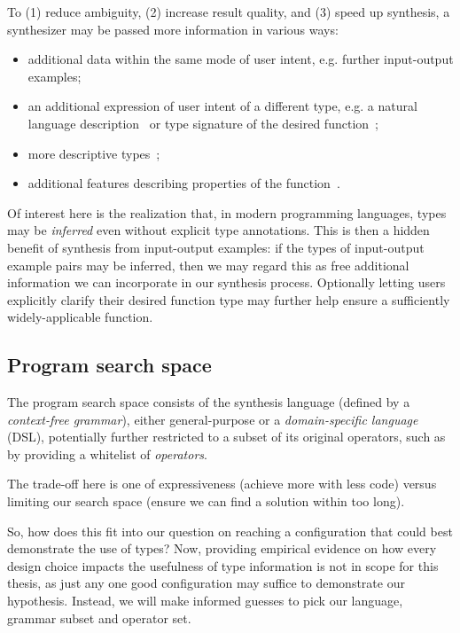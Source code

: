 \documentclass{article}
\begin{document}
To (1) reduce ambiguity, (2) increase result quality, and (3) speed up synthesis, a synthesizer may be passed more information in various ways:
\begin{itemize}
    \item additional data within the same mode of user intent, e.g. further input-output examples;
    \item an additional expression of user intent of a different type, e.g. a natural language description~\citep{polosukhin2018neural} or type signature of the desired function~\citep{myth};
    \item more descriptive types~\citep{synquid};
    \item additional features describing properties of the function~\citep{odena2020learning}.
\end{itemize}

Of interest here is the realization that, in modern programming languages, types may be \emph{inferred} even without explicit type annotations.
This is then a hidden benefit of synthesis from input-output examples:
if the types of input-output example pairs may be inferred,
then we may regard this as free additional information we can incorporate in our synthesis process.
    Optionally letting users explicitly clarify their desired function type
    may further help ensure a sufficiently widely-applicable function.

\subsection{Program search space}

The program search space consists of the synthesis language (defined by a \emph{context-free grammar}),
either general-purpose or a \emph{domain-specific language} (DSL),
potentially further restricted to a subset of its original operators,
such as by providing a whitelist of \emph{operators}.

The trade-off here is one of expressiveness (achieve more with less code) versus limiting our search space (ensure we can find a solution within too long).

So, how does this fit into our question on reaching a configuration that could best demonstrate the use of types?
Now, providing empirical evidence on how every design choice impacts the usefulness of type information is not in scope for this thesis,
as just any one good configuration may suffice to demonstrate our hypothesis.
Instead, we will make informed guesses
to pick our language, grammar subset and operator set.
\end{document}
